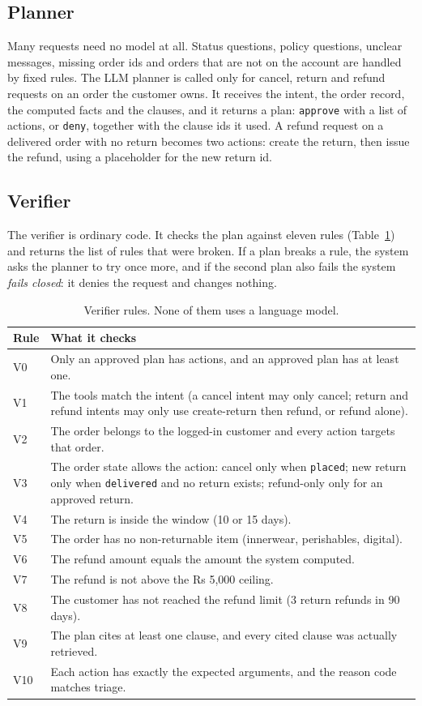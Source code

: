 \documentclass[11pt,a4paper]{article}
\begin{document}
\subsection{Planner}
Many requests need no model at all. Status questions, policy questions, unclear messages, missing order ids and orders that are not on the account are handled by fixed rules. The LLM planner is called only for cancel, return and refund requests on an order the customer owns. It receives the intent, the order record, the computed facts and the clauses, and it returns a plan: \texttt{approve} with a list of actions, or \texttt{deny}, together with the clause ids it used. A refund request on a delivered order with no return becomes two actions: create the return, then issue the refund, using a placeholder for the new return id.

\subsection{Verifier}
The verifier is ordinary code. It checks the plan against eleven rules (Table~\ref{tab:verifier}) and returns the list of rules that were broken. If a plan breaks a rule, the system asks the planner to try once more, and if the second plan also fails the system \emph{fails closed}: it denies the request and changes nothing.

\begin{table}[H]
\centering
\small
\begin{tabularx}{\textwidth}{@{}lX@{}}
\toprule
Rule & What it checks \\
\midrule
V0 & Only an approved plan has actions, and an approved plan has at least one. \\
V1 & The tools match the intent (a cancel intent may only cancel; return and refund intents may only use create-return then refund, or refund alone). \\
V2 & The order belongs to the logged-in customer and every action targets that order. \\
V3 & The order state allows the action: cancel only when \texttt{placed}; new return only when \texttt{delivered} and no return exists; refund-only only for an approved return. \\
V4 & The return is inside the window (10 or 15 days). \\
V5 & The order has no non-returnable item (innerwear, perishables, digital). \\
V6 & The refund amount equals the amount the system computed. \\
V7 & The refund is not above the Rs 5,000 ceiling. \\
V8 & The customer has not reached the refund limit (3 return refunds in 90 days). \\
V9 & The plan cites at least one clause, and every cited clause was actually retrieved. \\
V10 & Each action has exactly the expected arguments, and the reason code matches triage. \\
\bottomrule
\end{tabularx}
\caption{Verifier rules. None of them uses a language model.}
\label{tab:verifier}
\end{table}
\end{document}
